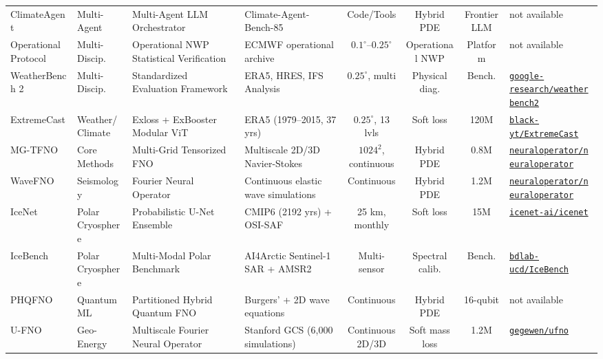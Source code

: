 \begin{table}[t]
{\begin{tabular}{@{}lp{2.0cm}p{3.0cm}p{3.4cm}cccp{3.0cm}@{}}
ClimateAgent~\cite{li2025climateagent} & Multi-Agent & Multi-Agent LLM Orchestrator & Climate-Agent-Bench-85 & Code/Tools & Hybrid PDE & Frontier LLM & not available \\
Operational Protocol~\cite{benbouallegue2024rise} & Multi-Discip. & Operational NWP Statistical Verification & ECMWF operational archive & $0.1^\circ$--$0.25^\circ$ & Operational NWP & Platform & not available \\
WeatherBench 2~\cite{rasp2024weatherbench2} & Multi-Discip. & Standardized Evaluation Framework & ERA5, HRES, IFS Analysis & $0.25^\circ$, multi & Physical diag. & Bench. & \href{https://github.com/google-research/weatherbench2}{\texttt{google-research/weatherbench2}} \\
ExtremeCast~\cite{xu2024extremecast} & Weather/Climate & Exloss + ExBooster Modular ViT & ERA5 (1979--2015, 37 yrs) & $0.25^\circ$, 13 lvls & Soft loss & 120M & \href{https://github.com/black-yt/ExtremeCast}{\texttt{black-yt/ExtremeCast}} \\
MG-TFNO~\cite{kossaifi2024multigrid} & Core Methods & Multi-Grid Tensorized FNO & Multiscale 2D/3D Navier-Stokes & $1024^2$, continuous & Hybrid PDE & 0.8M & \href{https://github.com/neuraloperator/neuraloperator}{\texttt{neuraloperator/neuraloperator}} \\
WaveFNO~\cite{yang2021seismic} & Seismology & Fourier Neural Operator & Continuous elastic wave simulations & Continuous & Hybrid PDE & 1.2M & \href{https://github.com/neuraloperator/neuraloperator}{\texttt{neuraloperator/neuraloperator}} \\
IceNet~\cite{andersson2021icenet} & Polar Cryosphere & Probabilistic U-Net Ensemble & CMIP6 (2192 yrs) + OSI-SAF & 25 km, monthly & Soft loss & 15M & \href{https://github.com/icenet-ai/icenet}{\texttt{icenet-ai/icenet}} \\
IceBench~\cite{taleghan2025icebench} & Polar Cryosphere & Multi-Modal Polar Benchmark & AI4Arctic Sentinel-1 SAR + AMSR2 & Multi-sensor & Spectral calib. & Bench. & \href{https://github.com/bdlab-ucd/IceBench}{\texttt{bdlab-ucd/IceBench}} \\
PHQFNO~\cite{marcandelli2025phqfno} & Quantum ML & Partitioned Hybrid Quantum FNO & Burgers' + 2D wave equations & Continuous & Hybrid PDE & 16-qubit & not available \\
U-FNO~\cite{wen2022ufno} & Geo-Energy & Multiscale Fourier Neural Operator & Stanford GCS (6,000 simulations) & Continuous 2D/3D & Soft mass loss & 1.2M & \href{https://github.com/gegewen/ufno}{\texttt{gegewen/ufno}} \\

\end{tabular}}
\end{table}
